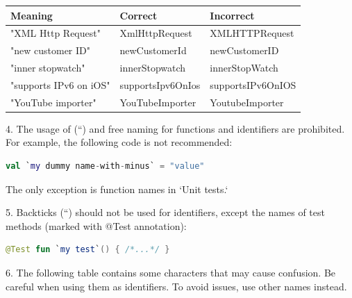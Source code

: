 \begin{center}

\begin{tabular}{ |p{5.0cm}|p{5.0cm}|p{5.0cm}| }

\hline

Meaning&Correct&Incorrect\\

\hline

 "XML Http Request" & XmlHttpRequest & XMLHTTPRequest \\

 "new customer ID" & newCustomerId & newCustomerID \\

 "inner stopwatch" & innerStopwatch & innerStopWatch \\

 "supports IPv6 on iOS" & supportsIpv6OnIos & supportsIPv6OnIOS \\

 "YouTube importer" & YouTubeImporter & YoutubeImporter \\

\hline

\end{tabular}

\end{center}

4.	The usage of (``) and free naming for functions and identifiers are prohibited. For example, the following code is not recommended:



\begin{lstlisting}[language=Kotlin]
val `my dummy name-with-minus` = "value" 
\end{lstlisting}


The only exception is function names in `Unit tests.`



5.	Backticks (``) should not be used for identifiers, except the names of test methods (marked with @Test annotation):

\begin{lstlisting}[language=Kotlin]
 @Test fun `my test`() { /*...*/ }
\end{lstlisting}
6.  The following table contains some characters that may cause confusion. Be careful when using them as identifiers. To avoid issues, use other names instead.

